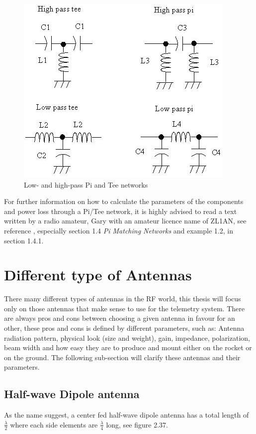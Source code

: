 \begin{figure}[h]
\centering
\includegraphics[scale=0.70]{figures/PiTee.PNG}
\caption{Low- and high-pass Pi and Tee networks}
\end{figure}

For further information on how to calculate the parameters of the components and power loss through a Pi/Tee network, it is highly advised to read a text written by a radio amateur, Gary with an amateur licence name of ZL1AN, see reference \cite{PiTeeNetwork}, especially section 1.4 \textit{Pi Matching Networks} and example 1.2, in section 1.4.1.

\section{Different type of Antennas}
There many different types of antennas in the RF world, this thesis will focus only on those antennas that make sense to use for the telemetry system. There are always pros and cons between choosing a given antenna in favour for an other, these pros and cons is defined by different parameters, such as: Antenna radiation pattern, physical look (size and weight), gain, impedance, polarization, beam width and how easy they are to produce and mount either on the rocket or on the ground. The following sub-section will clarify these antennas and their parameters.

\subsection{Half-wave Dipole antenna}
As the name suggest, a center fed half-wave dipole antenna has a total length of $\frac{\lambda}{2}$ where each side elements are $\frac{\lambda}{4}$ long, see figure 2.37. 

